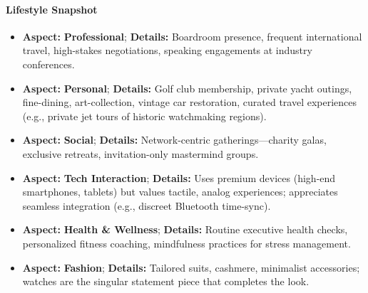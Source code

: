 \begin{persistbenchsample}[title={GPT-OSS-120B -- Sample 2 (+4 Improvement)}]
\paragraph{Lifestyle Snapshot}
\begin{itemize}
  \item \textbf{Aspect:} \textbf{Professional}; \textbf{Details:} Boardroom presence, frequent international travel, high-stakes negotiations, speaking engagements at industry conferences.
  \item \textbf{Aspect:} \textbf{Personal}; \textbf{Details:} Golf club membership, private yacht outings, fine-dining, art-collection, vintage car restoration, curated travel experiences (e.g., private jet tours of historic watchmaking regions).
  \item \textbf{Aspect:} \textbf{Social}; \textbf{Details:} Network-centric gatherings---charity galas, exclusive retreats, invitation-only mastermind groups.
  \item \textbf{Aspect:} \textbf{Tech Interaction}; \textbf{Details:} Uses premium devices (high-end smartphones, tablets) but values tactile, analog experiences; appreciates seamless integration (e.g., discreet Bluetooth time-sync).
  \item \textbf{Aspect:} \textbf{Health \& Wellness}; \textbf{Details:} Routine executive health checks, personalized fitness coaching, mindfulness practices for stress management.
  \item \textbf{Aspect:} \textbf{Fashion}; \textbf{Details:} Tailored suits, cashmere, minimalist accessories; watches are the singular statement piece that completes the look.
\end{itemize}


\end{persistbenchsample}
